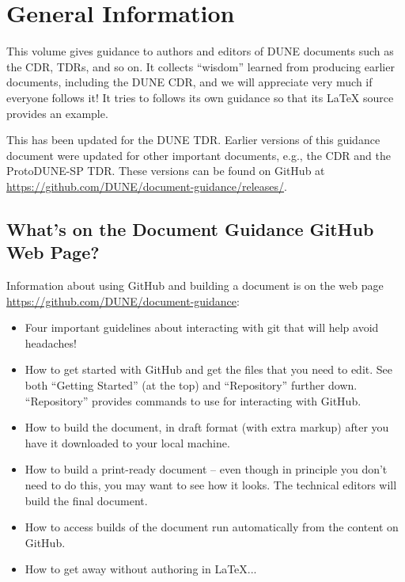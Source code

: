 \chapter{General Information}
\label{ch:gen}

This volume gives guidance to authors and editors of DUNE documents such as the CDR, TDRs, and so on. It collects ``wisdom'' learned from 
producing earlier documents, including the DUNE CDR, and we will appreciate 
very much if everyone follows it!  It tries to follows its own guidance so that its \LaTeX{} source
provides an example.  

This has been updated for the DUNE TDR. Earlier versions of this guidance document were updated for other important documents, e.g., the CDR and the ProtoDUNE-SP TDR.  These versions can be found on GitHub at \url{https://github.com/DUNE/document-guidance/releases/}.


\section{What's on the Document Guidance GitHub Web Page?}
\label{sec:gen-webpage}

Information about using GitHub and building a document is on the web page \url{https://github.com/DUNE/document-guidance}:

\begin{itemize}
\item Four important guidelines about interacting with git that will help avoid headaches!
\item How to get started with GitHub and get the files that you need to edit. See both ``Getting Started'' (at the top) and ``Repository'' further down.  ``Repository'' provides commands to use for interacting with GitHub.
\item How to build the document, in draft format (with extra markup) after you have it downloaded to your local machine.
\item How to build a print-ready document -- even though in principle you don't need to do this, you may want to see how it looks. The technical editors will build the final document.
\item How to access builds of the document run automatically from the content on GitHub.
\item How to get away without authoring in \LaTeX{}...
\end{itemize}

